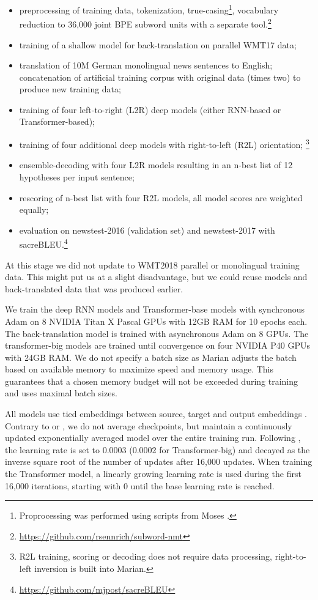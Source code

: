 \documentclass[11pt,a4paper]{article}
\begin{document}
  \begin{itemize}
  \item preprocessing of training data, tokenization, true-casing\footnote{Proprocessing was performed using scripts from Moses \cite{conf/acl/KoehnHBCFBCSMZDBCH07}.}, vocabulary reduction to 36,000 joint BPE subword units \cite{sennrich2016bpe} with a separate tool.\footnote{\url{https://github.com/rsennrich/subword-nmt}}
  \item training of a shallow model for back-translation on parallel WMT17 data;
  \item translation of 10M German monolingual news sentences to English; concatenation of artificial training corpus with original data (times two) to produce new training data;
  \item training of four left-to-right (L2R) deep models (either RNN-based or Transformer-based);
  \item training of four additional deep models with right-to-left (R2L) orientation; \footnote{R2L training, scoring or decoding does not require data processing, right-to-left inversion is built into Marian.}
  \item ensemble-decoding with four L2R models resulting in an n-best list of 12 hypotheses per input sentence;
  \item rescoring of n-best list with four R2L models, all model scores are weighted equally; 
  \item evaluation on newstest-2016 (validation set) and newstest-2017 with sacreBLEU.\footnote{\url{https://github.com/mjpost/sacreBLEU}}
  \end{itemize}
  
At this stage we did not update to WMT2018 parallel or monolingual training data. This might put us at a slight disadvantage, but we could reuse models and back-translated data that was produced earlier. 
  
We train the deep RNN models and Transformer-base models with synchronous Adam on 8 NVIDIA Titan X Pascal GPUs with 12GB RAM for 10 epochs each. The back-translation model is trained with asynchronous Adam on 8 GPUs.
The transformer-big models are trained until convergence on four NVIDIA P40 GPUs with 24GB RAM.  We do not specify a batch size as Marian adjusts the batch based on available memory to maximize speed and memory usage.  This guarantees that a chosen memory budget will not be exceeded during training and uses maximal batch sizes. 

All models use tied embeddings between source, target and output embeddings \cite{press2017using}. Contrary to  or , we do not average checkpoints, but maintain a continuously updated exponentially averaged model over the entire training run. Following , the learning rate is set to 0.0003 (0.0002 for Transformer-big) and decayed as the inverse square root of the number of updates after 16,000 updates. When training the Transformer model, a linearly growing learning rate is used during the first 16,000 iterations, starting with 0 until the base learning rate is reached. 
\end{document}

